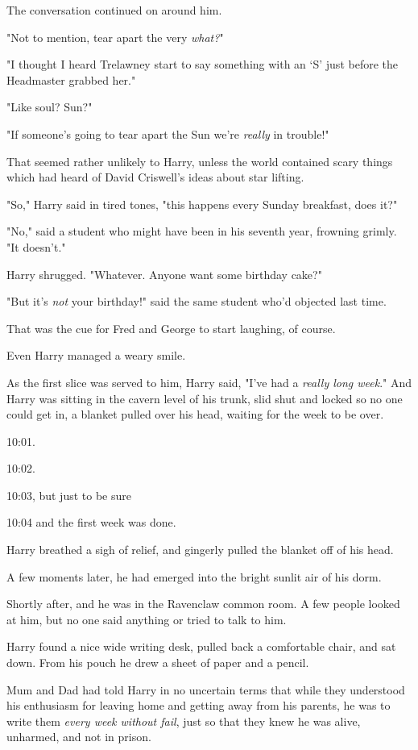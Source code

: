 The conversation continued on around him.

"Not to mention, tear apart the very \emph{what?}"

"I thought I heard Trelawney start to say something with an `S' just before the
Headmaster grabbed her."

"Like{\el} soul? Sun?"

"If someone's going to tear apart the Sun we're \emph{really} in trouble!"

That seemed rather unlikely to Harry, unless the world contained scary things
which had heard of David Criswell's ideas about star lifting.

"So," Harry said in tired tones, "this happens every Sunday breakfast, does it?"

"No," said a student who might have been in his seventh year, frowning grimly.
"It doesn't."

Harry shrugged. "Whatever. Anyone want some birthday cake?"

"But it's \emph{not} your birthday!" said the same student who'd objected last
time.

That was the cue for Fred and George to start laughing, of course.

Even Harry managed a weary smile.

As the first slice was served to him, Harry said, "I've had a \emph{really long
week}."
\sbreak
And Harry was sitting in the cavern level of his trunk, slid shut and locked so
no one could get in, a blanket pulled over his head, waiting for the week to be
over.

10:01.

10:02.

10:03, but just to be sure{\el}

10:04 and the first week was done.

Harry breathed a sigh of relief, and gingerly pulled the blanket off of his
head.

A few moments later, he had emerged into the bright sunlit air of his dorm.

Shortly after, and he was in the Ravenclaw common room. A few people looked at
him, but no one said anything or tried to talk to him.

Harry found a nice wide writing desk, pulled back a comfortable chair, and sat
down. From his pouch he drew a sheet of paper and a pencil.

Mum and Dad had told Harry in no uncertain terms that while they understood his
enthusiasm for leaving home and getting away from his parents, he was to write
them \emph{every week without fail}, just so that they knew he was alive,
unharmed, and not in prison.

